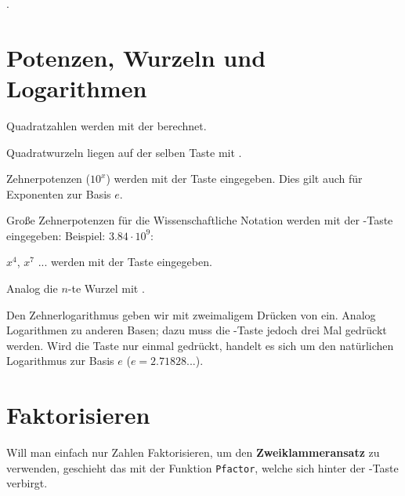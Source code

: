.
\newpage



\section{Potenzen, Wurzeln und
Logarithmen}\label{ln_log}\label{xhoch_nwurz}

Quadratzahlen werden mit der  berechnet.

Quadratwurzeln liegen auf der selben Taste
mit  .


Zehnerpotenzen ($10^x$) werden mit der Taste  eingegeben. Dies gilt auch für Exponenten zur Basis $e$.

Große Zehnerpotenzen\label{ee} für die Wissenschaftliche Notation werden mit der -Taste eingegeben: Beispiel: $3.84 \cdot{} 10^9$:\\

$x^4$, $x^7$ ... werden mit der Taste  eingegeben.

Analog die $n$-te Wurzel mit .

Den Zehnerlogarithmus geben wir mit zweimaligem Drücken
von   ein. Analog Logarithmen zu anderen
Basen; dazu muss die -Taste jedoch drei Mal gedrückt
werden.
Wird die Taste  nur einmal gedrückt, handelt es sich um
den natürlichen Logarithmus zur Basis $e$ ($e = 2.71828...$).



\section{Faktorisieren}\label{faktorisieren}


Will man einfach nur Zahlen Faktorisieren, \zB um den \textbf{Zweiklammeransatz} zu verwenden, geschieht das mit der Funktion \texttt{Pfactor}, welche sich hinter der -Taste verbirgt.

